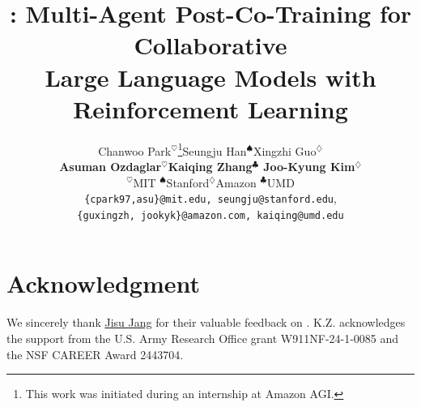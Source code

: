 \documentclass[11pt]{article}
\title{\ours \textcolor{MapleRed}{\faIcon{canadian-maple-leaf}}: Multi-Agent Post-Co-Training for Collaborative \\Large Language Models with Reinforcement Learning}
\author{Chanwoo Park$^\heartsuit$\thanks{This work was initiated during an internship at Amazon AGI.}\hspace{0.9cm}Seungju Han$^\spadesuit$\hspace{0.9cm}Xingzhi Guo$^\diamondsuit$\\
\textbf{\hspace{0cm}Asuman Ozdaglar$^\heartsuit$\hspace{0.66cm}Kaiqing Zhang$^\clubsuit$\hspace{0.48cm}
Joo-Kyung Kim$^\diamondsuit$} \\[0.1cm]
$^\heartsuit$MIT \hspace{0.8cm}$^\spadesuit$Stanford\hspace{0.8cm}$^\diamondsuit$Amazon \hspace{0.8cm}$^\clubsuit$UMD\\
\texttt{{\{cpark97,asu\}@mit.edu}, seungju@stanford.edu}, \\
\texttt{\{guxingzh, jookyk\}@amazon.com, kaiqing@umd.edu}
}
\begin{document}
\maketitle










\section*{Acknowledgment} We sincerely thank \href{https://scholar.google.com/citations?hl=en&user=K5WXLYEAAAAJ&view_op=list_works&authuser=2&sortby=pubdate}{Jisu Jang} for their valuable feedback on . K.Z. acknowledges the support from the U.S. Army Research Office grant W911NF-24-1-0085 and the NSF CAREER Award 2443704.


\onecolumn
\appendix






\end{document}
